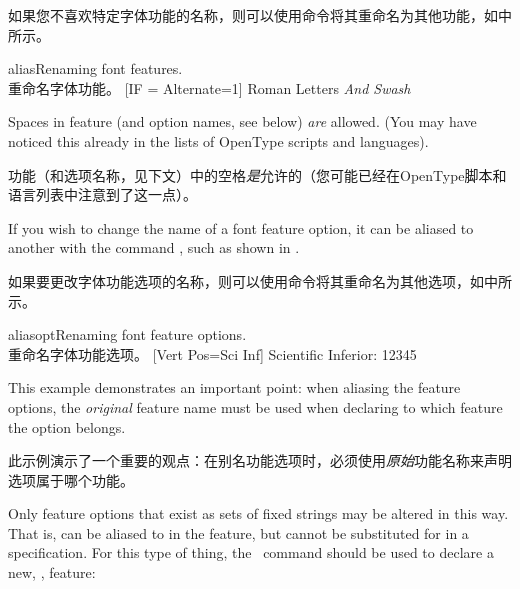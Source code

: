 \documentclass[a4paper]{l3doc}
\begin{document}
如果您不喜欢特定字体功能的名称，则可以使用命令将其重命名为其他功能，如中所示。

\begin{Xexample}{alias}{Renaming font features.\\重命名字体功能。}
  [IF = {Alternate=1}]
  Roman Letters \itshape And Swash
\end{Xexample}

Spaces in feature (and option names, see below) \emph{are} allowed. (You may have
noticed this already in the lists of OpenType scripts and languages).

功能（和选项名称，见下文）中的空格\emph{是}允许的（您可能已经在OpenType脚本和语言列表中注意到了这一点）。

\DescribeMacro{\aliasfontfeatureoption}
If you wish to change the name of a font feature option,
it can be aliased to another with the command
, such as shown in .

如果要更改字体功能选项的名称，则可以使用命令将其重命名为其他选项，如中所示。

\begin{Lexample}{aliasopt}{Renaming font feature options.\\重命名字体功能选项。}
  [Vert Pos=Sci Inf]
   Scientific Inferior: 12345
\end{Lexample}

This example demonstrates an important point: when aliasing the feature
options, the \emph{original} feature name must be used when declaring
to which feature the option belongs.

此示例演示了一个重要的观点：在别名功能选项时，必须使用\emph{原始}功能名称来声明选项属于哪个功能。

Only feature options that exist as sets of fixed strings may be altered in
this way. That is,  can be aliased to  in the
 feature, but  cannot be substituted for 
in a  specification. For this type of thing, the \cmd\newfontfeature\
command should be used to declare a new, \eg,  feature:
\end{document}
